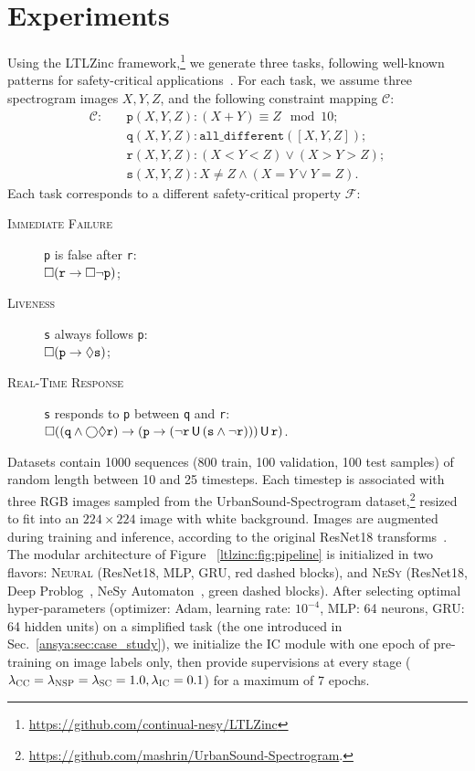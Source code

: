 \section{Experiments}\label{ansya:sec:experiments}
Using the LTLZinc framework,\footnote{\url{https://github.com/continual-nesy/LTLZinc}} we generate three tasks, following well-known \LTL patterns for safety-critical applications~\cite{dwyer1998property}. For each task, we assume three spectrogram images $X, Y, Z$, %
and the following constraint mapping $\mathcal{C}$:
\begin{align*}
\mathcal{C}\colon\quad&\texttt{p}(X, Y, Z): (X+Y) \equiv Z \mod 10;\\
&\texttt{q}(X, Y, Z): \texttt{all\_different}([X, Y, Z]);\\
&\texttt{r}(X, Y, Z): (X < Y < Z) \vee (X > Y > Z);\\
&\texttt{s}(X, Y, Z): X \not =  Z \wedge (X = Y \vee Y = Z).
\end{align*}
Each task corresponds to a different safety-critical property $\mathcal{F}$:
\begin{description}
\item[\textsc{Immediate Failure}] \texttt{p} is false after \texttt{r}:\\ $\Box (\texttt{r} \rightarrow \Box \neg \texttt{p})$;
\item[\textsc{Liveness}] \texttt{s} always follows \texttt{p}:\\ $\Box (\texttt{p} \rightarrow \Diamond \texttt{s})$;
\item[\textsc{Real-Time Response}] \texttt{s} responds to \texttt{p} between \texttt{q} and \texttt{r}:\\ $\Box ((\texttt{q} \wedge \bigcirc \Diamond \texttt{r}) \rightarrow (\texttt{p} \rightarrow (\neg \texttt{r} \,\mathsf{U}\, (\texttt{s} \wedge \neg \texttt{r}))) \,\mathsf{U}\, \texttt{r})$.
\end{description}
%
Datasets contain 1000 sequences (800 train, 100 validation, 100 test samples) of random length between 10 and 25 timesteps. Each timestep is associated with three RGB images sampled from the UrbanSound-Spectrogram dataset,\footnote{\url{https://github.com/mashrin/UrbanSound-Spectrogram}.} resized to fit into an $224\times 224$ image with white background. Images are augmented during training and inference, according to the original ResNet18 transforms~\cite{he2016deep}.
%
The  modular architecture of Figure ~\ref{ltlzinc:fig:pipeline} is initialized in two flavors: \textsc{Neural} (ResNet18, MLP, GRU, red dashed blocks), and \textsc{NeSy} (ResNet18, Deep Problog~\cite{manhaeve2019deepproblog}, NeSy Automaton~\cite{umili2023grounding}, green dashed blocks).
After selecting optimal hyper-parameters (optimizer: Adam, learning rate: $10^{-4}$, MLP:  64 neurons, GRU: 64 hidden units) on a simplified task (the one introduced in Sec.~\ref{ansya:sec:case_study}), we initialize the \textsc{IC} module with one epoch of pre-training on image labels only, then provide supervisions at every stage ($\lambda_{\textsc{CC}} = \lambda_{\textsc{NSP}} = \lambda_{\textsc{SC}} = 1.0, \lambda_\textsc{IC} = 0.1$) for a maximum of 7 epochs. 


